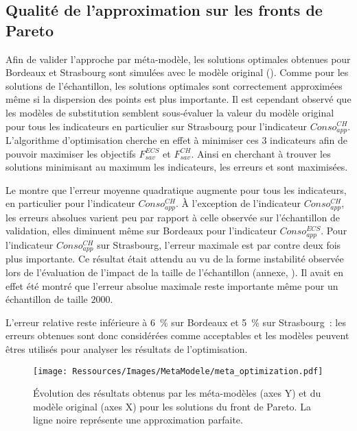 \subsection{Qualité de l’approximation sur les fronts de Pareto} %
\label{sub:qualite_de_l_approximation_sur_les_fronts_de_pareto}
Afin de valider l’approche par méta-modèle, les solutions optimales obtenues pour Bordeaux
et Strasbourg sont simulées avec le modèle original ().
Comme pour les solutions de l’échantillon, les solutions optimales sont correctement
approximées même si la dispersion des points est plus importante. Il est cependant
observé que les modèles de substitution semblent sous-évaluer la valeur du modèle
original pour tous les indicateurs en particulier sur Strasbourg pour l’indicateur
$Conso_{app}^{CH}$. L’algorithme d’optimisation cherche en effet à minimiser ces $3$
indicateurs afin de pouvoir maximiser les objectifs $F_{sav}^{ECS}$ et $F_{sav}^{CH}$.
Ainsi en cherchant à trouver les solutions minimisant au maximum les indicateurs, les
erreurs  et  sont maximisées.

Le  montre que l’erreur moyenne quadratique augmente pour
tous les indicateurs, en particulier pour l’indicateur $Conso_{app}^{CH}$. À l’exception
de l’indicateur $Conso_{app}^{CH}$, les erreurs absolues varient peu par rapport à celle
observée sur l’échantillon de validation, elles diminuent même sur Bordeaux pour
l’indicateur $Conso_{app}^{ECS}$. Pour l’indicateur $Conso_{app}^{CH}$ sur Strasbourg,
l’erreur maximale est par contre deux fois plus importante. Ce résultat était attendu au
vu de la forme instabilité observée lors de l’évaluation de l’impact de la taille de
l’échantillon (annexe, ). Il avait en effet été montré que l’erreur
absolue maximale reste importante même pour un échantillon de taille $2000$.

L’erreur relative reste inférieure à \SI{6}{\percent} sur Bordeaux et
\SI{5}{\percent} sur Strasbourg~: les erreurs obtenues sont donc considérées
comme acceptables et les modèles peuvent êtres utilisés pour analyser les résultats de
l’optimisation.


\begin{figure}
    \centering
    \texttt{[image: Ressources/Images/MetaModele/meta\_optimization.pdf]}
    \caption[Évaluation de la précision des méta-modèles pour les solutions optimales]
            {Évolution des résultats obtenus par les méta-modèles (axes Y) et du modèle
             original (axes X) pour les solutions du front de Pareto.
             La ligne noire représente une approximation parfaite.}
    \label{fig:validite_meta_ssc_optimisation}
\end{figure}


